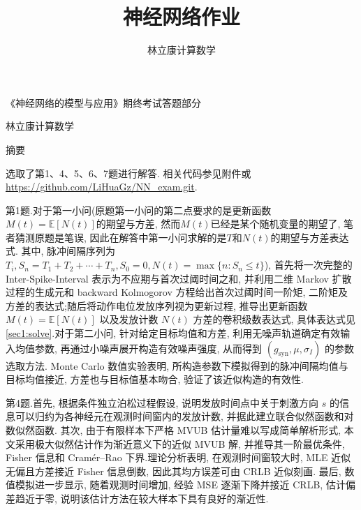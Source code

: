 ﻿\documentclass[UTF8,  zihao=-4]{ctexart}
\title{神经网络作业}
\author{林立康\quad 计算数学\quad 25210180078}
\begin{document}


\clearpage
\begin{titlepage}
\pagestyle{empty}
\begin{center}
\vspace*{0.7cm}

{\heiti 《神经网络的模型与应用》期终考试答题部分\par}

\vspace{0.6cm}

{ 林立康\quad 计算数学\par}

\vspace{0.6cm}

{\heiti 摘\quad 要\par}
\end{center}

\vspace{0.25em}

\begingroup
{}
\setlength{\parindent}{2em}
\setlength{\parskip}{0.18em}
选取了第1、4、5、6、7题进行解答. 相关代码参见附件或 \url{https://github.com/LiHuaGz/NN_exam.git}.

第1题.对于第一小问(原题第一小问的第二点要求的是更新函数$M(t)=\mathbb{E}[N(t)]$的期望与方差,  然而$M(t)$已经是某个随机变量的期望了,  笔者猜测原题是笔误,  因此在解答中第一小问求解的是$T$和\(N(t)\)的期望与方差表达式. 其中,  脉冲间隔序列为$T_i, S_n=T_1+T_2+\cdots+T_n,  S_0=0,  N(t)=\max\{n: S_n\leq t\}$),  首先将一次完整的 Inter-Spike-Interval 表示为不应期与首次过阈时间之和, 并利用二维 Markov 扩散过程的生成元和 backward Kolmogorov 方程给出首次过阈时间一阶矩, 二阶矩及方差的表达式;随后将动作电位发放序列视为更新过程, 推导出更新函数 \(M(t)=\mathbb E[N(t)]\) 以及发放计数 \(N(t)\) 方差的卷积级数表达式,  具体表达式见\ref{sec1:solve}.对于第二小问, 针对给定目标均值和方差, 利用无噪声轨道确定有效输入均值参数, 再通过小噪声展开构造有效噪声强度, 从而得到 \((g_{\mathrm{syn}}, \mu, \sigma_I)\) 的参数选取方法. Monte Carlo 数值实验表明, 所构造参数下模拟得到的脉冲间隔均值与目标均值接近, 方差也与目标值基本吻合, 验证了该近似构造的有效性.

第4题.首先, 根据条件独立泊松过程假设, 说明发放时间点中关于刺激方向 \(s\) 的信息可以归约为各神经元在观测时间窗内的发放计数, 并据此建立联合似然函数和对数似然函数. 其次, 由于有限样本下严格 MVUB 估计量难以写成简单解析形式, 本文采用极大似然估计作为渐近意义下的近似 MVUB 解, 并推导其一阶最优条件,  Fisher 信息和 Cramér--Rao 下界.理论分析表明, 在观测时间窗较大时,  MLE 近似无偏且方差接近 Fisher 信息倒数, 因此其均方误差可由 CRLB 近似刻画. 最后, 数值模拟进一步显示, 随着观测时间增加, 经验 MSE 逐渐下降并接近 CRLB, 估计偏差趋近于零, 说明该估计方法在较大样本下具有良好的渐近性.


\end{titlepage}
\end{document}
